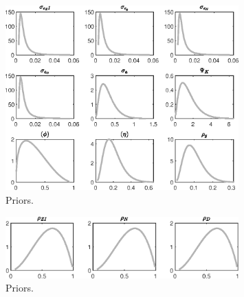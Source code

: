  
\begin{figure}[H]
\centering
\includegraphics[width=0.80\textwidth]{BRS_growth_ext_shopping/graphs/BRS_growth_ext_shopping_Priors1}
\caption{Priors.}\label{Fig:Priors:1}
\end{figure}
\begin{figure}[H]
\centering
\includegraphics[width=0.80\textwidth]{BRS_growth_ext_shopping/graphs/BRS_growth_ext_shopping_Priors2}
\caption{Priors.}\label{Fig:Priors:2}
\end{figure}
 
